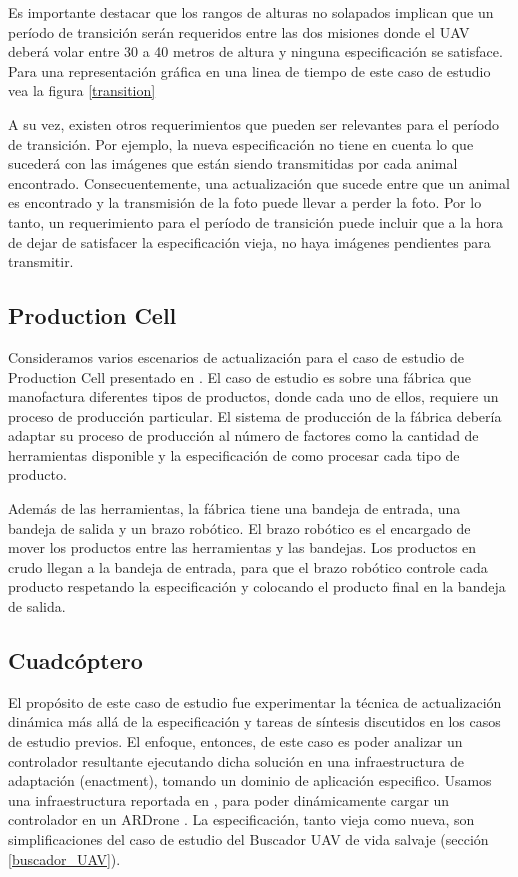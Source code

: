 Es importante destacar que los rangos de alturas no solapados implican que un período de transición serán requeridos
entre las dos misiones donde el UAV deberá volar entre 30 a 40 metros de altura y ninguna especificación se satisface.
Para una representación gráfica en una linea de tiempo de este caso de estudio vea la figura \ref{transition}

A su vez, existen otros requerimientos que pueden ser relevantes para el período de transición. Por ejemplo, la nueva
especificación no tiene en cuenta lo que sucederá con las imágenes que están siendo transmitidas por cada animal
encontrado. Consecuentemente, una actualización que sucede entre que un animal es encontrado y la transmisión de la foto
puede llevar a perder la foto. Por lo tanto, un requerimiento para el período de transición puede incluir que a la hora
de dejar de satisfacer la especificación vieja, no haya imágenes pendientes para transmitir.


\subsection{Production Cell}

Consideramos varios escenarios de actualización para el caso de estudio de Production Cell presentado en
\cite{Lewerentz:1995:646391}. El caso de estudio es sobre una fábrica que manofactura diferentes tipos de productos,
donde cada uno de ellos, requiere un proceso de producción particular. El sistema de producción de la fábrica debería
adaptar su proceso de producción al número de factores como la cantidad de herramientas disponible y la especificación
de como procesar cada tipo de producto. 

Además de las herramientas, la fábrica tiene una bandeja de entrada, una bandeja de salida y un brazo robótico. El brazo
robótico es el encargado de mover los productos entre las herramientas y las bandejas. Los productos en crudo llegan a
la bandeja de entrada, para que el brazo robótico controle cada producto respetando la especificación y colocando el
producto final en la bandeja de salida.

\subsection{Cuadcóptero}

El propósito de este caso de estudio fue experimentar la técnica de actualización dinámica más allá de la especificación
y tareas de síntesis discutidos en los casos de estudio previos. El enfoque, entonces, de este caso es poder analizar un
controlador resultante ejecutando dicha solución en una infraestructura de adaptación (enactment), tomando un dominio de
aplicación especifico. Usamos una infraestructura reportada en \cite{Braberman:2013:CSM:2486788.2487002}, para poder
dinámicamente cargar un controlador en un ARDrone \cite{ARDrone}. La especificación, tanto vieja como nueva, son
simplificaciones del caso de estudio del Buscador UAV de vida salvaje (sección \ref{buscador_UAV}). 

